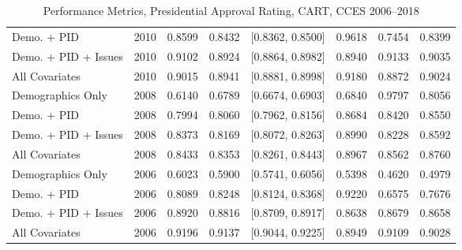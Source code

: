 \begin{table}[H]
\begin{tabular}{lrrrlrrr}
  Demo. + PID & 2010 & 0.8599 & 0.8432 & [0.8362, 0.8500] & 0.9618 & 0.7454 & 0.8399 \\ 
  Demo. + PID + Issues & 2010 & 0.9102 & 0.8924 & [0.8864, 0.8982] & 0.8940 & 0.9133 & 0.9035 \\ 
  All Covariates & 2010 & 0.9015 & 0.8941 & [0.8881, 0.8998] & 0.9180 & 0.8872 & 0.9024 \\ 
  Demographics Only & 2008 & 0.6140 & 0.6789 & [0.6674, 0.6903] & 0.6840 & 0.9797 & 0.8056 \\ 
  Demo. + PID & 2008 & 0.7994 & 0.8060 & [0.7962, 0.8156] & 0.8684 & 0.8420 & 0.8550 \\ 
  Demo. + PID + Issues & 2008 & 0.8373 & 0.8169 & [0.8072, 0.8263] & 0.8990 & 0.8228 & 0.8592 \\ 
  All Covariates & 2008 & 0.8433 & 0.8353 & [0.8261, 0.8443] & 0.8967 & 0.8562 & 0.8760 \\ 
  Demographics Only & 2006 & 0.6023 & 0.5900 & [0.5741, 0.6056] & 0.5398 & 0.4620 & 0.4979 \\ 
  Demo. + PID & 2006 & 0.8089 & 0.8248 & [0.8124, 0.8368] & 0.9220 & 0.6575 & 0.7676 \\ 
  Demo. + PID + Issues & 2006 & 0.8920 & 0.8816 & [0.8709, 0.8917] & 0.8638 & 0.8679 & 0.8658 \\ 
  All Covariates & 2006 & 0.9196 & 0.9137 & [0.9044, 0.9225] & 0.8949 & 0.9109 & 0.9028 \\ 
   \bottomrule
\end{tabular}
\caption{Performance Metrics, Presidential Approval Rating, CART, CCES 2006--2018} 
\label{tab:cces_presapprov_cart}
\end{table}
